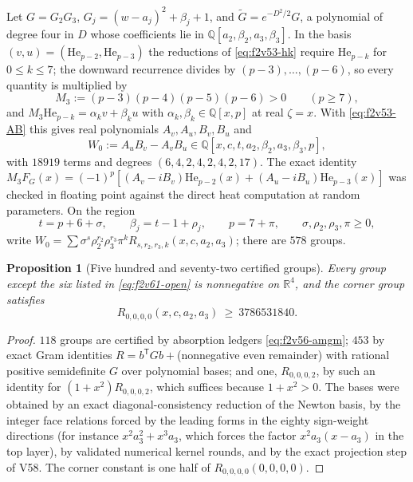 \documentclass[11pt]{article}
\newtheorem{proposition}[theorem]{Proposition}
\theoremstyle{definition}
\theoremstyle{remark}
\begin{document}
Let \(G=G_2G_3\), \(G_j=(w-a_j)^2+\beta_j+1\), and
\(\widetilde G=e^{-D^2/2}G\), a polynomial of degree four in \(D\) whose
coefficients lie in \(\mathbb Q[a_2,\beta_2,a_3,\beta_3]\).  In the basis
\((v,u)=(\mathrm{He}_{p-2},\mathrm{He}_{p-3})\) the reductions of
\eqref{eq:f2v53-hk} require \(\mathrm{He}_{p-k}\) for \(0\le k\le7\); the
downward recurrence divides by \((p-3),\ldots,(p-6)\), so every quantity
is multiplied by
\begin{equation}
 M_3:=(p-3)(p-4)(p-5)(p-6)>0\qquad(p\ge7),
 \label{eq:f2v61-M}
\end{equation}
and \(M_3\mathrm{He}_{p-k}=\alpha_kv+\beta_ku\) with
\(\alpha_k,\beta_k\in\mathbb Q[x,p]\) at real \(\zeta=x\).  With
\eqref{eq:f2v53-AB} this gives real polynomials \(A_v,A_u,B_v,B_u\) and
\begin{equation}
 W_0:=A_uB_v-A_vB_u\in\mathbb Q[x,c,t,a_2,\beta_2,a_3,\beta_3,p],
 \label{eq:f2v61-W0}
\end{equation}
with \(18919\) terms and degrees \((6,4,2,4,2,4,2,17)\).  The exact
identity
\(M_3F_G(x)=(-1)^p[(A_v-iB_v)\mathrm{He}_{p-2}(x)+(A_u-iB_u)\mathrm{He}_{p-3}(x)]\)
was checked in floating point against the direct heat computation at
random parameters.  On the region
\begin{equation}
 t=p+6+\sigma,\qquad \beta_j=t-1+\rho_j,\qquad p=7+\pi,\qquad
 \sigma,\rho_2,\rho_3,\pi\ge0,
 \label{eq:f2v61-region}
\end{equation}
write \(W_0=\sum\sigma^s\rho_2^{r_2}\rho_3^{r_3}\pi^kR_{s,r_2,r_3,k}(x,c,a_2,a_3)\);
there are \(578\) groups.

\begin{proposition}[Five hundred and seventy-two certified groups]
\label{prop:f2v61-groups}
Every group except the six listed in \eqref{eq:f2v61-open} is
nonnegative on \(\mathbb R^4\), and the corner group satisfies
\begin{equation}
 R_{0,0,0,0}(x,c,a_2,a_3)\ \ge\ 3786531840 .
 \label{eq:f2v61-corner}
\end{equation}
\end{proposition}

\begin{proof}
\(118\) groups are certified by absorption ledgers
\eqref{eq:f2v56-amgm}; \(453\) by exact Gram identities
\(R=b^{\mathsf T}Gb+\)(nonnegative even remainder) with rational positive
semidefinite \(G\) over polynomial bases; and one, \(R_{0,0,0,2}\), by
such an identity for \((1+x^2)R_{0,0,0,2}\), which suffices because
\(1+x^2>0\).  The bases were obtained by an exact diagonal-consistency
reduction of the Newton basis, by the integer face relations forced by
the leading forms in the eighty sign-weight directions (for instance
\(x^2a_3^2+x^3a_3\), which forces the factor \(x^2a_3(x-a_3)\) in the top
layer), by validated numerical kernel rounds, and by the exact
projection step of V58.  The corner constant is one half of
\(R_{0,0,0,0}(0,0,0,0)\).
\end{proof}
\end{document}
